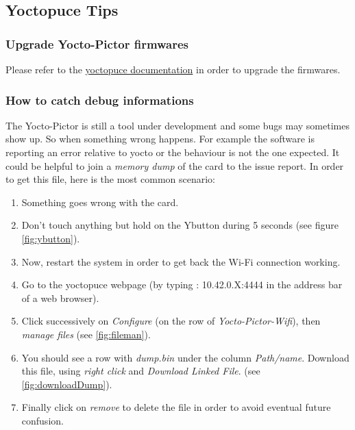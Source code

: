 \subsection{Yoctopuce Tips}

\subsubsection{Upgrade Yocto-Pictor firmwares}
\label{annex:yoctoUpdate} 

Please refer to the
\href{https://www.yoctopuce.com/EN/products/virtualhub/doc/VIRTHUB0.usermanual.html#CHAP3SEC4}
{yoctopuce documentation} in order to upgrade the firmwares.


\subsubsection{How to catch debug informations}

The Yocto-Pictor is still a tool under development and some bugs may
sometimes show up. So when something wrong happens. For example the software is 
reporting an error relative to yocto or the behaviour is not the one expected. 
It could be helpful to join a \emph{memory dump} of the card to the issue
report. In order to get this file, here is the most common scenario:

\begin{enumerate}
	\item Something goes wrong with the card.

	\item Don't touch anything but hold on the Ybutton during 5 seconds 
		(see figure \ref{fig:ybutton}).

	\item Now, restart the system in order to get back the Wi-Fi connection 
		working.

	\item Go to the yoctopuce webpage (by typing : 10.42.0.X:4444 in the
		address bar of a web browser).

	\item Click successively on \emph{Configure} (on the row of
		\emph{Yocto-Pictor-Wifi}), then \emph{manage files} 
		(see \ref{fig:fileman}).

	\item You should see a row with \emph{dump.bin} under the column
		\emph{Path/name}.
		Download this file, using \emph{right click} and \emph{Download
		Linked File}.
		(see \ref{fig:downloadDump}).

	\item Finally click on \emph{remove} to delete the file in order to avoid
		eventual future confusion.
\end{enumerate}

